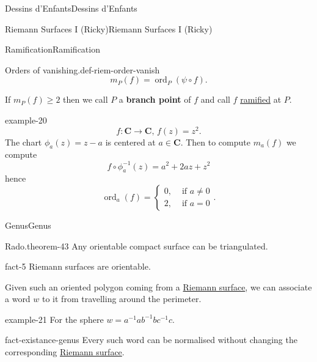 \documentclass[10pt,]{book}
\newcommand{\terminology}[1]{\textbf{#1}}
\numberwithin{equation}{section}
\newcommand{\inv}{^{-1}}
\newcommand{\CC}{\mathbf{C}}
\DeclareMathOperator{\ord}{ord}
\newcommand{\amp}{&}
\begin{document}
\begin{chapterptx}{Dessins d'Enfants}{}{Dessins d'Enfants}{}{}
\begin{sectionptx}{Riemann Surfaces I (Ricky)}{}{Riemann Surfaces I (Ricky)}{}{}
\begin{subsectionptx}{Ramification}{}{Ramification}{}{}
\begin{definition}{Orders of vanishing.}{def-riem-order-vanish}
\begin{equation*}
m_P(f) = \ord_P(\psi\circ f)\text{.}
\end{equation*}
%
\par
\hypertarget{p-499}{}%
If \(m_P(f)\ge 2\) then we call \(P\) a \terminology{branch point} of \(f\) and call \(f\) \hyperref[def-dess-ramified]{ramified} at \(P\).%
\end{definition}
\begin{example}{}{example-20}%
\hypertarget{p-500}{}%
%
\begin{equation*}
f\colon \CC \to \CC,\,f(z) = z^2\text{.}
\end{equation*}
The chart \(\phi_a(z) = z-a\) is centered at \(a \in \CC\). Then to compute \(m_a(f)\) we compute%
\begin{equation*}
f\circ \phi\inv_a(z) = a^2 + 2az + z^2
\end{equation*}
hence%
\begin{equation*}
\ord_a(f) =\begin{cases} 0,\amp \text{ if } a\ne 0\\ 2,\amp\text{ if } a= 0\end{cases}\text{.}
\end{equation*}
%
\end{example}
\end{subsectionptx}
%
%
\typeout{************************************************}
\typeout{************************************************}
%
\begin{subsectionptx}{Genus}{}{Genus}{}{}\label{subsection-48}
\begin{theorem}{Rado.}{}{theorem-43}%
\hypertarget{p-501}{}%
Any orientable compact surface can be triangulated.%
\end{theorem}
\begin{fact}{}{}{fact-5}%
\hypertarget{p-502}{}%
Riemann surfaces are orientable.%
\end{fact}
\hypertarget{p-503}{}%
Given such an oriented polygon coming from a \hyperref[def-top-riem-surface]{Riemann surface}, we can associate a word \(w\) to it from travelling around the perimeter.%
\begin{example}{}{example-21}%
\hypertarget{p-504}{}%
For the sphere \(w = a\inv ab\inv bc\inv c\).%
\end{example}
\begin{fact}{}{}{fact-existance-genus}%
\hypertarget{p-505}{}%
Every such word can be normalised without changing the corresponding \hyperref[def-top-riem-surface]{Riemann surface}.%
\begin{equation*}

\end{equation*}
\end{fact}
\end{subsectionptx}
\end{sectionptx}
\end{chapterptx}
\end{document}

